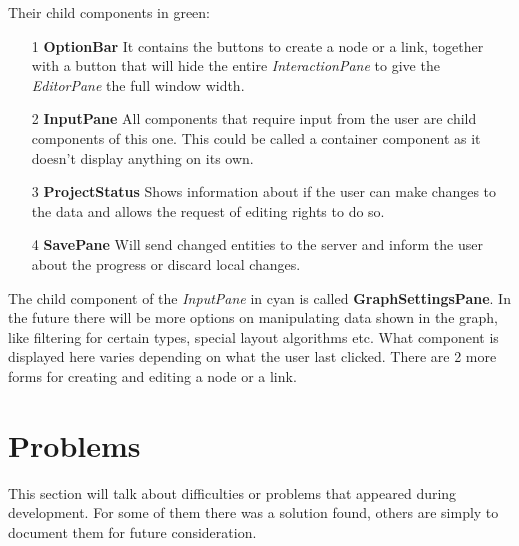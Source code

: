 Their child components in green:
\begin{itemize}
\item[1] \textbf{OptionBar} It contains the buttons to create a node or a link, together with a button that will hide the entire \emph{InteractionPane} to give the \emph{EditorPane} the full window width.
\item[2] \textbf{InputPane} All components that require input from the user are child components of this one. This could be called a container component as it doesn't display anything on its own.
\item[3] \textbf{ProjectStatus} Shows information about if the user can make changes to the data and allows the request of editing rights to do so.
\item[4] \textbf{SavePane} Will send changed entities to the server and inform the user about the progress or discard local changes.
\end{itemize}

The child component of the \emph{InputPane} in cyan is called \textbf{GraphSettingsPane}. In the future there will be more options on manipulating data shown in the graph, like filtering for certain types, special layout algorithms etc. What component is displayed here varies depending on what the user last clicked. There are 2 more forms for creating and editing a node or a link.

\section{Problems}
This section will talk about difficulties or problems that appeared during development. For some of them there was a solution found, others are simply to document them for future consideration.

